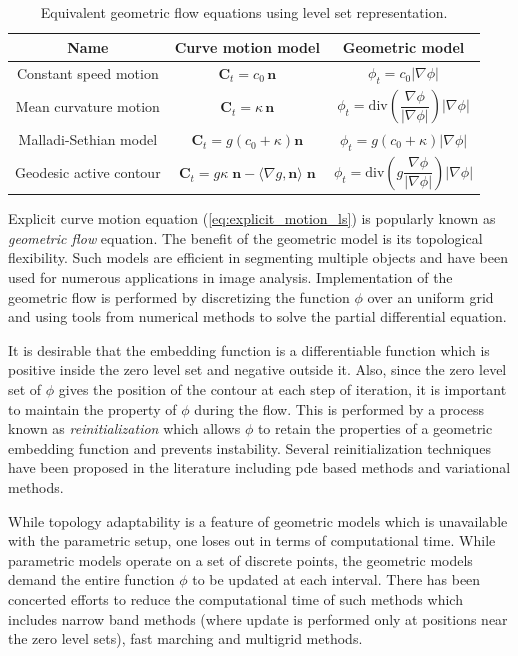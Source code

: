 \begin{table}[b]
\centering
\caption[Geometric Flow]{Equivalent geometric flow equations using level set representation.}
\begin{tabular}{c|c|c}
\textbf{Name} & \textbf{Curve motion model} & \textbf{Geometric model} \\
\hline \hline 
Constant speed motion & $\textbf{C}_t=c_0\, \textbf{n}$ & $\phi_t=c_0|\nabla
\phi|$ \\
Mean curvature motion & $\textbf{C}_t=\kappa\, \textbf{n}$ & $\phi_t=\text{div}\left(\dfrac{\nabla\phi}{|\nabla\phi|}\right)|\nabla
\phi|$ \\
Malladi-Sethian model & $\textbf{C}_t=g\left(c_0+\kappa\right) \textbf{n}$ & $\phi_t=g\left(c_0+\kappa\right)|\nabla
\phi|$ \\
Geodesic active contour & $\textbf{C}_t=g\kappa\;\textbf{n}-\langle\nabla g,\textbf{n} \rangle \;\textbf{n}$ & $\phi_t= \text{div}\left(g\dfrac{\nabla\phi}{|\nabla\phi|}\right)|\nabla\phi|$\\
\hline
\end{tabular}
\label{table:geometric_flow}
\end{table}
Explicit curve motion equation (\ref{eq:explicit_motion_ls}) is popularly known as \textit{geometric flow} equation. The benefit of the geometric model is its topological flexibility. Such models are efficient in segmenting multiple objects and have been used for numerous applications in image analysis. Implementation of the geometric flow is performed by discretizing the function $\phi$ over an uniform grid and using tools from numerical methods to solve the partial differential equation. 

It is desirable that the embedding function is a differentiable function which is positive inside the zero level set and negative outside it. Also, since the zero level set of $\phi$ gives the position of the contour at each step of iteration, it is important to maintain the property of $\phi$ during the flow. This is performed by a process known as \textit{reinitialization} which allows $\phi$ to retain the properties of a geometric embedding function and  prevents instability. Several reinitialization techniques have been proposed in the literature including pde based methods and variational methods\cite{osher_sethian,caselles_geodesic,li_without_reinit_CVPR,li_DRLS}. 


While topology adaptability is a feature of geometric models which is unavailable with the parametric setup, one loses out in terms of computational time. While parametric models operate on a set of discrete points, the geometric models demand the entire function $\phi$ to be updated at each interval. There has been concerted efforts to reduce the computational time of such methods which includes narrow band methods (where update is performed only at positions near the zero level sets), fast marching and multigrid methods\cite{malladi_sethian,papandreou2007multigrid,goldenberg2001fast,sethian1999fast,shi2008real}. 

